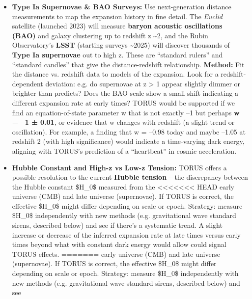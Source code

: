 \documentclass[]{article}
\begin{document}
{\begin{itemize}
  \begin{itemize}
  \item
    \textbf{Type Ia Supernovae \& BAO Surveys:} Use next-generation
    distance measurements to map the expansion history in fine detail.
    The \emph{Euclid} satellite (launched 2023) will measure
    \textbf{baryon acoustic oscillations (BAO)} and galaxy clustering up
    to redshift z \textasciitilde{}2, and the Rubin Observatory's
    \textbf{LSST} (starting surveys \textasciitilde{}2025) will discover
    thousands of \textbf{Type Ia supernovae} out to high z. These are
    ``standard rulers'' and ``standard candles'' that give the
    distance-redshift relationship. \textbf{Method:} Fit the distance
    vs. redshift data to models of the expansion. Look for a
    redshift-dependent deviation: e.g. do supernovae at z \textgreater{}
    1 appear slightly dimmer or brighter than \LambdaCDM predicts? Does the
    BAO scale show a small shift indicating a different expansion rate
    at early times? TORUS would be supported if we find an
    equation-of-state parameter w that is not exactly --1 but perhaps
    \textbf{w = --1 ± 0.01}, or evidence that w changes with redshift (a
    slight trend or oscillation)​. For example, a finding that w =
    --0.98 today and maybe --1.05 at redshift 2 (with high significance)
    would indicate a time-varying dark energy, aligning with TORUS's
    prediction of a ``heartbeat'' in cosmic acceleration​.
  \item
    \textbf{Hubble Constant and High-z vs Low-z Tension:} TORUS offers a
    possible resolution to the current \textbf{Hubble tension} -- the
    discrepancy between the Hubble constant \$H\_0\$ measured from the
<<<<<<< HEAD
    early universe (CMB) and late universe (supernovae)\hspace{0pt}. If
    TORUS is correct, the effective \$H\_0\$ might differ depending on
    scale or epoch. Strategy: measure \$H\_0\$ independently with new
    methods (e.g. gravitational wave standard sirens, described below)
    and see if there's a systematic trend. A slight increase or decrease
    of the inferred expansion rate at late times versus early times
    beyond what \LambdaCDM with constant dark energy would allow could signal
    TORUS effects\hspace{0pt}.
=======
    early universe (CMB) and late universe (supernovae)​. If TORUS is
    correct, the effective \$H\_0\$ might differ depending on scale or
    epoch. Strategy: measure \$H\_0\$ independently with new methods
    (e.g. gravitational wave standard sirens, described below) and see

\end{itemize}
\end{itemize}}
\end{document}
